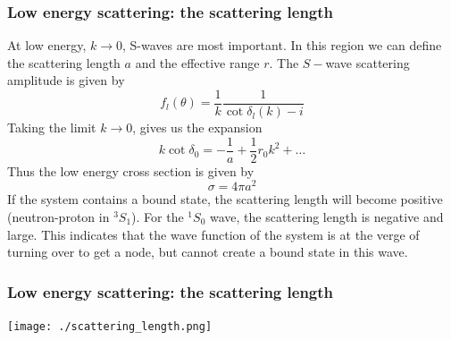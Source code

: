 \documentclass[compress]{beamer}
\begin{document}

\frame
{
\frametitle{Low energy scattering: the scattering length}
\begin{small}
{\scriptsize

At low energy, $k \rightarrow 0$, S-waves are most important. In this region we can define the scattering length $a$ and the effective range $r$. The $S-$wave scattering amplitude is given by
\[
f_l(\theta) = \frac{1}{k}\frac{1}{\cot \delta_l(k) - i}
\]
Taking the limit $k \rightarrow 0$, gives us the expansion
\[
k \cot \delta_0 = -\frac{1}{a} + \frac{1}{2}r_0 k^2 + \ldots
\]
Thus the low energy cross section is given by
\[
\sigma = 4\pi a^2
\]
If the system contains a bound state, the scattering length will become positive (neutron-proton in $^3S_1$). For the $^1S_0$ wave, the scattering length is negative and large. This indicates that the wave function of the system is at the verge of turning over to get a node, but cannot create a bound state in this wave.%
}
\end{small}

}

\frame
{
\frametitle{Low energy scattering: the scattering length}
\begin{center}
\texttt{[image: ./scattering\_length.png]}
\end{center}
}
\end{document}

